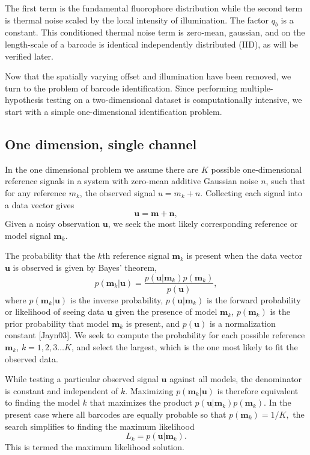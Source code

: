 The first term is the fundamental fluorophore distribution while the second term is thermal noise scaled by the local intensity of illumination. The factor $q_b$ is a constant. This conditioned thermal noise term is zero-mean, gaussian, and on the length-scale of a barcode is identical independently distributed (IID), as will be verified later.

Now that the spatially varying offset and illumination have been removed, we turn to the problem of barcode identification. Since performing multiple-hypothesis testing on a two-dimensional dataset is computationally intensive, we start with a simple one-dimensional identification problem. 

\subsection{One dimension, single channel}
In the one dimensional problem we assume there are $K$ possible one-dimensional reference signals in a system with zero-mean additive Gaussian noise $n$, such that for any reference $m_k$, the observed signal $u=m_k+n$. Collecting each signal into a data vector gives
\begin{equation}
\mathbf{u}=\mathbf{m} + \mathbf{n},
\end{equation}
Given a noisy observation $\mathbf{u}$, we seek the most likely corresponding reference or model signal $\mathbf{m}_k$. 

The probability that the $k$th reference signal $\mathbf{m}_k$ is present when the data vector $\mathbf{u}$ is observed is given by Bayes' theorem,
\begin{equation}\label{eq:Bayes}
p(\mathbf{m}_k|\mathbf{u}) = \frac{p(\mathbf{u}|\mathbf{m}_k)p(\mathbf{m}_k)} {p(\mathbf{u})},
\end{equation}
where $p(\mathbf{m}_k|\mathbf{u})$ is the inverse probability, $p(\mathbf{u}|\mathbf{m}_k)$ is the forward probability or likelihood of seeing data $\mathbf{u}$ given the presence of model $\mathbf{m}_k$, $p(\mathbf{m}_k)$ is the prior probability that model $\mathbf{m}_k$ is present, and $p(\mathbf{u})$ is a normalization constant [Jayn03]. We seek to compute the probability for each possible reference $\mathbf{m}_k$, $k=1,2,3 \ldots K$, and select the largest, which is the one most likely to fit the observed data.

While testing a particular observed signal $\mathbf{u}$ against all models, the denominator is constant and independent of $k$. Maximizing $p(\mathbf{m}_k|\mathbf{u})$ is therefore equivalent to finding the model $k$ that maximizes the product  $p(\mathbf{u}|\mathbf{m}_k)p(\mathbf{m}_k)$.
In the present case where all barcodes are equally probable so that
$p(\mathbf{m}_k)=1/K,$ 
the search simplifies to finding the maximum likelihood 
\begin{equation}
L_k = p(\mathbf{u}|\mathbf{m}_k).
\end{equation}
This is termed the maximum likelihood solution.



